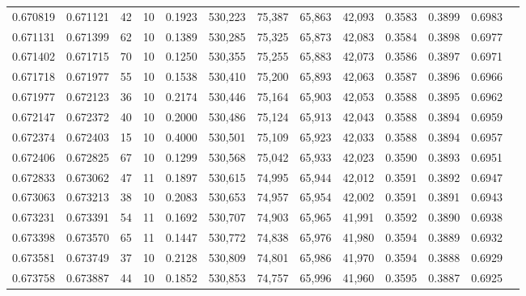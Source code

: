 \begin{tabular}{rrrrrrrrrrrrr}
0.670819 & 0.671121 &    42 &  10 &                                     0.1923 & 530,223 &  75,387 &  65,863 &  42,093 & 0.3583 & 0.3899 & 0.6983 \\
0.671131 & 0.671399 &    62 &  10 &                                     0.1389 & 530,285 &  75,325 &  65,873 &  42,083 & 0.3584 & 0.3898 & 0.6977 \\
0.671402 & 0.671715 &    70 &  10 &                                     0.1250 & 530,355 &  75,255 &  65,883 &  42,073 & 0.3586 & 0.3897 & 0.6971 \\
0.671718 & 0.671977 &    55 &  10 &                                     0.1538 & 530,410 &  75,200 &  65,893 &  42,063 & 0.3587 & 0.3896 & 0.6966 \\
0.671977 & 0.672123 &    36 &  10 &                                     0.2174 & 530,446 &  75,164 &  65,903 &  42,053 & 0.3588 & 0.3895 & 0.6962 \\
0.672147 & 0.672372 &    40 &  10 &                                     0.2000 & 530,486 &  75,124 &  65,913 &  42,043 & 0.3588 & 0.3894 & 0.6959 \\
0.672374 & 0.672403 &    15 &  10 &                                     0.4000 & 530,501 &  75,109 &  65,923 &  42,033 & 0.3588 & 0.3894 & 0.6957 \\
0.672406 & 0.672825 &    67 &  10 &                                     0.1299 & 530,568 &  75,042 &  65,933 &  42,023 & 0.3590 & 0.3893 & 0.6951 \\
0.672833 & 0.673062 &    47 &  11 &                                     0.1897 & 530,615 &  74,995 &  65,944 &  42,012 & 0.3591 & 0.3892 & 0.6947 \\
0.673063 & 0.673213 &    38 &  10 &                                     0.2083 & 530,653 &  74,957 &  65,954 &  42,002 & 0.3591 & 0.3891 & 0.6943 \\
0.673231 & 0.673391 &    54 &  11 &                                     0.1692 & 530,707 &  74,903 &  65,965 &  41,991 & 0.3592 & 0.3890 & 0.6938 \\
0.673398 & 0.673570 &    65 &  11 &                                     0.1447 & 530,772 &  74,838 &  65,976 &  41,980 & 0.3594 & 0.3889 & 0.6932 \\
0.673581 & 0.673749 &    37 &  10 &                                     0.2128 & 530,809 &  74,801 &  65,986 &  41,970 & 0.3594 & 0.3888 & 0.6929 \\
0.673758 & 0.673887 &    44 &  10 &                                     0.1852 & 530,853 &  74,757 &  65,996 &  41,960 & 0.3595 & 0.3887 & 0.6925 \\

\end{tabular}
